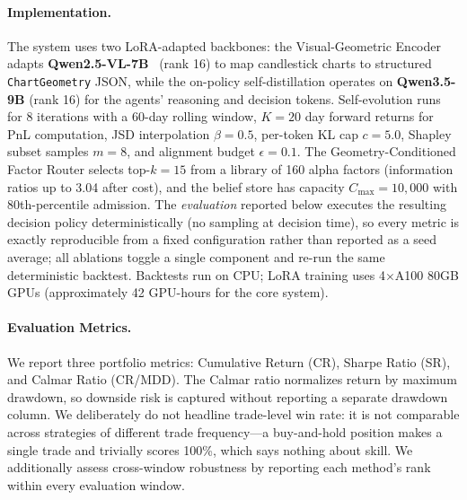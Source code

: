 \paragraph{Implementation.} The system uses two LoRA-adapted backbones: the Visual-Geometric Encoder adapts \textbf{Qwen2.5-VL-7B}~\cite{qwen25vl2024} (rank 16) to map candlestick charts to structured \texttt{ChartGeometry} JSON, while the on-policy self-distillation operates on \textbf{Qwen3.5-9B} (rank 16) for the agents' reasoning and decision tokens. Self-evolution runs for 8 iterations with a 60-day rolling window, $K{=}20$ day forward returns for PnL computation, JSD interpolation $\beta{=}0.5$, per-token KL cap $c{=}5.0$, Shapley subset samples $m{=}8$, and alignment budget $\epsilon{=}0.1$. The Geometry-Conditioned Factor Router selects top-$k{=}15$ from a library of 160 alpha factors (information ratios up to 3.04 after cost), and the belief store has capacity $C_{\max}{=}10{,}000$ with 80th-percentile admission. The \emph{evaluation} reported below executes the resulting decision policy deterministically (no sampling at decision time), so every metric is exactly reproducible from a fixed configuration rather than reported as a seed average; all ablations toggle a single component and re-run the same deterministic backtest. Backtests run on CPU; LoRA training uses 4$\times$A100 80GB GPUs (approximately 42 GPU-hours for the core system).

\paragraph{Evaluation Metrics.} We report three portfolio metrics: Cumulative Return (CR), Sharpe Ratio (SR), and Calmar Ratio (CR/MDD). The Calmar ratio normalizes return by maximum drawdown, so downside risk is captured without reporting a separate drawdown column. We deliberately do not headline trade-level win rate: it is not comparable across strategies of different trade frequency---a buy-and-hold position makes a single trade and trivially scores 100\%, which says nothing about skill. We additionally assess cross-window robustness by reporting each method's rank within every evaluation window.

